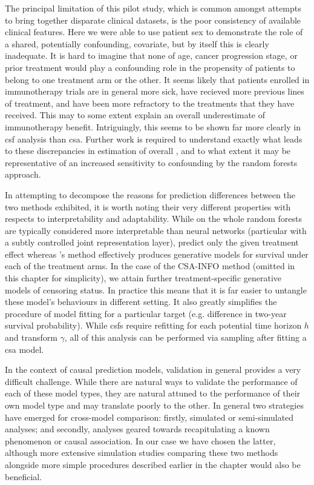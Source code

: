 \documentclass[../thesis.tex]{subfiles}
\begin{document}
The principal limitation of this pilot study, which is common amongst attempts to bring together disparate clinical datasets, is the poor consistency of available clinical features. Here we were able to use patient sex to demonstrate the role of a shared, potentially confounding, covariate, but by itself this is clearly inadequate. It is hard to imagine that none of age, cancer progression stage, or prior treatment would play a confounding role in the propensity of patients to belong to one treatment arm or the other. It seems likely that patients enrolled in immunotherapy trials are in general more sick, have recieved more previous lines of treatment, and have been more refractory to the treatments that they have received. This may to some extent explain an overall underestimate of immunotherapy benefit. Intriguingly, this seems to be shown far more clearly in \gls{csf} analysis than \gls{csa}. Further work is required to understand exactly what leads to these discrepancies in estimation of overall , and to what extent it may be representative of an increased sensitivity to confounding by the random forests approach.

In attempting to decompose the reasons for prediction differences between the two methods exhibited, it is worth noting their very different properties with respects to interpretability and adaptability. While on the whole random forests are typically considered more interpretable than neural networks (particular with a subtly controlled joint representation layer),  predict only the given treatment effect whereas \citet{chapfuwa_enabling_2021}'s method effectively produces generative models for survival under each of the treatment arms. In the case of the CSA-INFO method (omitted in this chapter for simplicity), we attain further treatment-specific generative models of censoring status. In practice this means that it is far easier to untangle these model's behaviours in different setting. It also greatly simplifies the procedure of model fitting for a particular target (e.g. difference in two-year survival probability). While \glspl{csf} require refitting for each potential time horizon $h$ and transform $\gamma$, all of this analysis can be performed via sampling after fitting a \gls{csa} model.

In the context of causal prediction models, validation in general provides a very difficult challenge. While there are natural ways to validate the performance of each of these model types, they are natural attuned to the performance of their own model type and may translate poorly to the other. In general two strategies have emerged for cross-model comparison: firstly, simulated or semi-simulated analyses; and secondly, analyses geared towards recapitulating a known phenomenon or causal association. In our case we have chosen the latter, although more extensive simulation studies comparing these two methods alongside more simple procedures described earlier in the chapter would also be beneficial.
\end{document}
